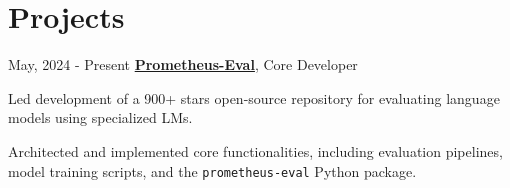 \section{Projects}

\begin{twocolentry}{May, 2024 - Present}
\textbf{\href{https://github.com/prometheus-eval/prometheus-eval}{Prometheus-Eval}}, Core Developer
\end{twocolentry}

\vspace{0.10 cm}
\begin{onecolentry}
\begin{highlights}
\item Led development of a 900+ stars open-source repository for evaluating language models using specialized LMs.
\item Architected and implemented core functionalities, including evaluation pipelines, model training scripts, and the \texttt{prometheus-eval} Python package.
\end{highlights}
\end{onecolentry}
